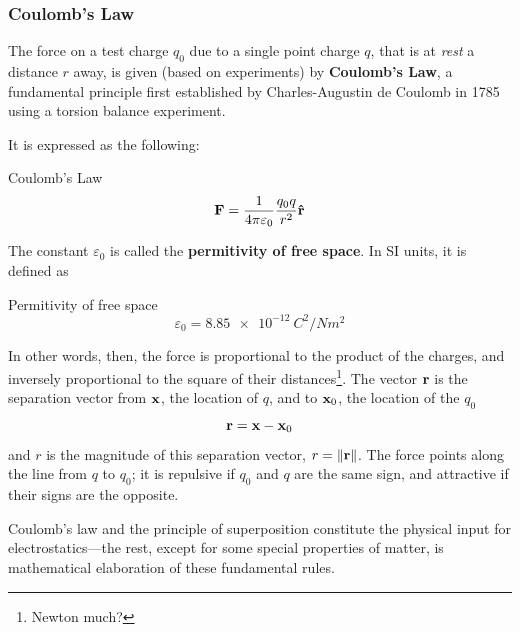 	\subsubsection{Coulomb's Law}
		The force on a test charge $q_0$ due to a single point charge $q$, that is at \textit{rest} a 
		distance $r$ away, is given (based on experiments) by \textbf{Coulomb's Law},
		a fundamental principle first established by Charles-Augustin de Coulomb in 1785 using a torsion balance experiment.
		
		It is expressed as the following:
		\begin{definition}{Coulomb's Law}
			\begin{equation}
				\vb{F} = \frac{1}{4\pi\varepsilon_0} \frac{q_0 q}{r^2}\vu{r} 
			\end{equation}
		\end{definition}
		The constant $\varepsilon_0$ is called the \textbf{permitivity of free space}. In
		SI units, it is defined as 
		\begin{definition}{Permitivity of free space}
		    \begin{equation}
				\varepsilon_0 = \SI{8.85e-12}{C^2/Nm^2}
		    \end{equation}
		\end{definition}
		In other words, then, the force is proportional to the product of the charges,
		and inversely proportional to the square of their distances\footnote{Newton much?}.
		The vector $\vb{r}$ is the separation vector from $\vb{x}$, the location of $q$, and to $\vb{x}_0$,
		the location of the $q_0$ 
		\[
			\vb{r} = \vb{x} - \vb{x}_0
		\]
		and $r$ is the magnitude of this separation vector, $r=\norm{\vb{r}}$. The 
		force points along the line from $q$ to $q_0$; it is repulsive if $q_0$ and 
		$q$ are the same sign, and attractive if their signs are the opposite.
		
		Coulomb’s law and the principle of superposition constitute the physical input
		for electrostatics—the rest, except for some special properties of matter, is 
		mathematical elaboration of these fundamental rules.
		\newpage

